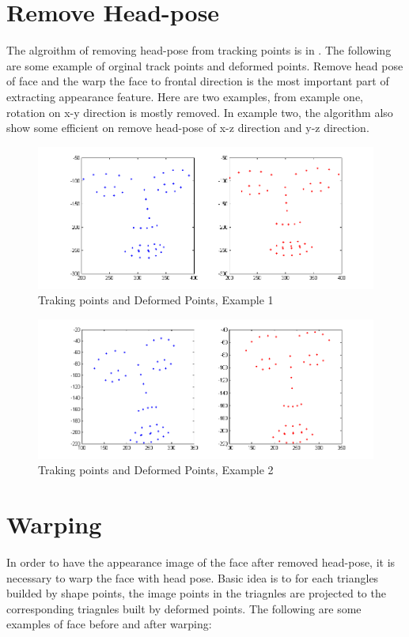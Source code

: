 \section{Remove Head-pose}
The algroithm of removing head-pose from tracking points is in \cite{saragih2011deformable}. The following are some example of orginal track points and deformed points. Remove head pose of face and the warp the face to frontal direction is the most important part of extracting appearance feature. Here are two examples, from example one, rotation on x-y direction is mostly removed. In example two, the algorithm also show some efficient on remove head-pose of x-z direction and y-z direction.
\begin{figure}[h!]
\centering
\includegraphics[width=150mm]{imgs/160954_Deform_213.png}
\caption{Traking points and Deformed Points, Example 1}
\end{figure}

\begin{figure}[h!]
\centering
\includegraphics[width=150mm]{imgs/160954_Deform_233.png}
\caption{Traking points and Deformed Points, Example 2}
\end{figure}

\section{Warping}
In order to have the appearance image of the face after removed head-pose, it is necessary to warp the face with head pose. Basic idea is to for each triangles builded by shape points, the image points in the triagnles are projected to the corresponding triagnles built by deformed points. The following are some examples of face before and after warping:


